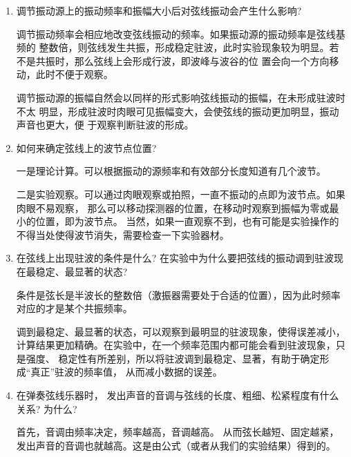 \documentclass[11pt]{article}
\begin{document}
\begin{enumerate}
    \item 调节振动源上的振动频率和振幅大小后对弦线振动会产生什么影响?
    
    \begin{kaishu}
        调节振动频率会相应地改变弦线振动的频率。如果振动源的振动频率是弦线基频的
整数倍，则弦线发生共振，形成稳定驻波，此时实验现象较为明显。若不是共振时，那么弦线上会形成行波，即波峰与波谷的位
置会向一个方向移动，此时不便于观察。
    
          调节振动源的振幅自然会以同样的形式影响弦线振动的振幅，在未形成驻波时不太
明显，形成驻波时肉眼可见振幅变大，会使弦线的振动更加明显，振动声音也更大，便
于观察判断驻波的形成。
    \end{kaishu}
   
    \item 如何来确定弦线上的波节点位置?
    
    \begin{kaishu}
        一是理论计算。可以根据振动的源频率和有效部分长度知道有几个波节。
        
        二是实验观察。可以通过肉眼观察或拍照，一直不振动的点即为波节点。如果肉眼不易观察，
        那么可以移动探测器的位置，在移动时观察到振幅为零或最小的位置，即为波节点。
        当然，如果一直观察不到，也有可能是实验操作的不得当处使得波节消失，需要检查一下实验器材。

    \end{kaishu}
  
    \item 在弦线上出现驻波的条件是什么? 
    在实验中为什么要把弦线的振动调到驻波现在最稳定、最显著的状态?
    
    \begin{kaishu}
         条件是弦长是半波长的整数倍（激振器需要处于合适的位置），因为此时频率对应的才是某个共振频率。 
 
         调到最稳定、最显著的状态，可以观察到最明显的驻波现象，使得误差减小，
计算结果更加精确。在实验中，在一个频率范围内都可能会看到驻波现象，只是强度、
稳定性有所差别，所以将驻波调到最稳定、显著，有助于确定形成“真正”驻波的频率值，
从而减小数据的误差。

    \end{kaishu}
   
    \item 在弹奏弦线乐器时， 发出声音的音调与弦线的长度、粗细、松紧程度有什么关系? 为什么?
    
    \begin{kaishu}
        首先，音调由频率决定，频率越高，音调越高。 从而弦长越短、固定越紧， 
发出声音的音调也就越高。这是由公式（或者从我们的实验结果）得到的。


\end{kaishu}
\end{enumerate}
\end{document}

